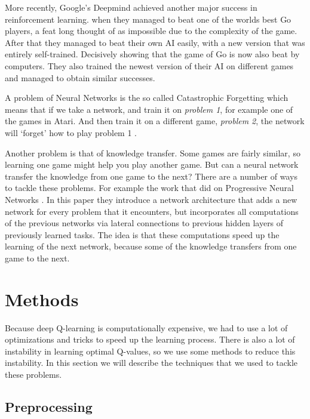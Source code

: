\documentclass{article}
\begin{document}
More recently, Google's Deepmind achieved another major success in reinforcement learning. when they managed to beat one of the worlds best Go players, a feat long thought of as impossible due to the complexity of the game. After that they managed to beat their own AI easily, with a new version that was entirely self-trained. Decisively showing that the game of Go is now also beat by computers. They also trained the newest version of their AI on different games and managed to obtain similar successes.

A problem of Neural Networks is the so called Catastrophic Forgetting which means that if we take a network, and train it on \textit{problem 1}, for example one of the games in Atari. And then train it on a different game, \textit{problem 2}, the network will `forget' how to play problem 1 \cite{rusu2016progressive}.

Another problem is that of knowledge transfer. Some games are fairly similar, so learning one game might help you play another game. But can a neural network transfer the knowledge from one game to the next? There are a number of ways to tackle these problems. For example the work that \citeauthor{rusu2016progressive} did on Progressive Neural Networks \cite{rusu2016progressive}. In this paper they introduce a network architecture that adds a new network for every problem that it encounters, but incorporates all computations of the previous networks via lateral connections to previous hidden layers of previously learned tasks. The idea is that these computations speed up the learning of the next network, because some of the knowledge transfers from one game to the next. 


\section{Methods}
Because deep Q-learning is computationally expensive, we had to use a lot of optimizations and tricks to speed up the learning process. There is also a lot of instability in learning optimal Q-values, so we use some methods to reduce this instability. In this section we will describe the techniques that we used to tackle these problems.

\subsection{Preprocessing}
\end{document}
